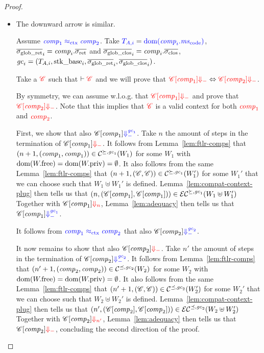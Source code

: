 \documentclass[a4paper]{article}
\begin{document}
\begin{proof}
\begin{itemize}
  \item The downward arrow is similar.

    Assume $\src{\var{comp}_1} \sconeq \src{\var{comp}_2}$.
    Take $\src{\ta[,i]} = \src{\dom(\var{comp}_i.\mscode)}$, $\gsigrets_i = \var{comp}_i.\sigrets$ and $\gsigcloss_i = \var{comp}_i.\sigcloss$, $\gc_i = (\ta[,i],\stkb_i,\gsigrets_i,\gsigcloss_i)$.

    Take a $\trg{\context}$ such that $\vdash \trg{\context}$ and we will prove that
    $\trg{\plug{\context}{\var{comp}_1} \term} \Leftrightarrow
    \trg{\plug{\context}{\var{comp}_2} \term}$.

    By symmetry, we can assume w.l.o.g. that $\trg{\plug{\context}{\var{comp}_1} \term}$ and prove that $\trg{\plug{\context}{\var{comp}_2} \term}$.
    Note that this implies that $\trg{\context}$ is a valid context for both $\trg{\var{comp}_1}$ and $\trg{\var{comp}_2}$.

    First, we show that also $\plug{\context}{\var{comp}_1} \src{\sterm{\gc_1}}$.
    Take $n$ the amount of steps in the termination of $\plug{\context}{\var{comp}_1} \trg{\term}$.
    It follows from Lemma~\ref{lem:ftlr-comps} that $\npair[n+1]{(\var{comp}_1,\var{comp}_1)} \in \lrcomp[\succeq,\gc_1](W_1)$ for some $W_1$ with $\dom(\pwfree) = \dom(\pwpriv) = \emptyset$.
    It also follows from the same Lemma~\ref{lem:ftlr-comps} that $\npair[n+1]{(\context,\context)} \in \lrcomp[\succeq,\gc_1](W_1')$ for some $W_1'$ that we can choose such that $W_1 \uplus W_1'$ is defined.
    Lemma~\ref{lem:compat-context-plug} then tells us that $\npair{(\plug{\context}{\var{comp}_1}, \plug{\context}{\var{comp}_1})} \in \lrec[\succeq,\gc_1](W_1\uplus W_1')$
    Together with $\plug{\context}{\var{comp}_1} \trg{\term[n]}$, Lemma~\ref{lem:adequacy} then tells us that $\plug{\context}{\var{comp}_1} \src{\sterm{\gc_1}}$.

    It follows from $\src{\var{comp}_1} \sconeq \src{\var{comp}_2}$ that also $\plug{\context}{\var{comp}_2} \src{\sterm{\gc_2}}$.

    It now remains to show that also $\plug{\context}{\var{comp}_2} \trg{\term}$.
    Take $n'$ the amount of steps in the termination of $\plug{\context}{\var{comp}_2} \src{\sterm{\gc_2}}$.
    It follows from Lemma~\ref{lem:ftlr-comps} that $\npair[n'+1]{(\var{comp}_2,\var{comp}_2)} \in \lrcomp[\preceq,\gc_2](W_2)$ for some $W_2$ with $\dom(\pwfree) = \dom(\pwpriv) = \emptyset$.
    It also follows from the same Lemma~\ref{lem:ftlr-comps} that $\npair[n'+1]{(\context,\context)} \in \lrcomp[\preceq,\gc_2](W_2')$ for some $W_2'$ that we can choose such that $W_2 \uplus W_2'$ is defined.
    Lemma~\ref{lem:compat-context-plug} then tells us that $\npair[n']{(\plug{\context}{\var{comp}_2}, \plug{\context}{\var{comp}_2})} \in \lrec[\preceq,\gc_2](W_2\uplus W_2')$
    Together with $\plug{\context}{\var{comp}_2} \trg{\term[n']}$, Lemma~\ref{lem:adequacy} then tells us that $\plug{\context}{\var{comp}_2} \trg{\term}$, concluding the second direction of the proof.
  \end{itemize}
\end{proof}
\end{document}

